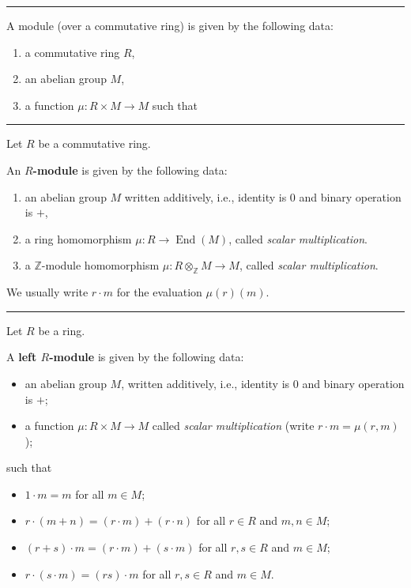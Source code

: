 \documentclass[12pt]{article}
\newcommand{\keyword}[1]{\textbf{#1}}
\newcommand{\sepline}{\rule{\textwidth}{0.4pt}}
\newenvironment{cd}{\begin{center}\begin{tikzcd}}{\end{tikzcd}\end{center}}
\theoremstyle{definition}
\newcommand{\Z}{\mathbb{Z}}
\newcommand{\<}{\left\langle}
\renewcommand{\>}{\right\rangle}
\newcommand{\tensor}{\otimes}
\newcommand{\id}{\mathrm{id}}
\DeclareMathOperator{\End}{End}
\renewcommand{\_}[1]{{_{#1}}}
\begin{document}
\sepline

A \keyword{}{module} (over a commutative ring) is given by the following data:
\begin{enumerate}[(1)]
    \item a commutative ring $R$,
    \item an abelian group $M$,
    \item a function $\mu : R \times M \to M$ such that
\end{enumerate} 

\sepline

Let $R$ be a commutative ring.

An \keyword{$R$-module} is given by the following data:
\begin{enumerate}[(1)]
    \item an abelian group $M$ written additively, i.e., identity is $0$ and binary operation is $+$,
    \item a ring homomorphism $\mu : R \to \End(M)$, called \emph{scalar multiplication}.
    \item a $\Z$-module homomorphism $\mu : R \tensor_\Z M \to M$, called \emph{scalar multiplication}.
\end{enumerate}
We usually write $r \cdot m$ for the evaluation $\mu(r)(m)$.

\sepline

Let $R$ be a ring.

A \keyword{left $R$-module} is given by the following data:
\begin{itemize}
    \item an abelian group $M$, written additively, i.e., identity is $0$ and binary operation is $+$;
    \item a function $\mu : R \times M \to M$ called \emph{scalar multiplication} (write $r \cdot m = \mu(r, m)$);
\end{itemize}
such that
\begin{itemize}
    \item $1 \cdot m = m$ for all $m \in M$;
    \item $r \cdot (m + n) = (r \cdot m) + (r \cdot n)$ for all $r \in R$ and $m, n \in M$;
    \item $(r + s) \cdot m = (r \cdot m) + (s \cdot m)$ for all $r, s \in R$ and $m \in M$;
    \item $r \cdot (s \cdot m) = (rs) \cdot m$ for all $r, s \in R$ and $m \in M$.
\end{itemize}
\end{document}
